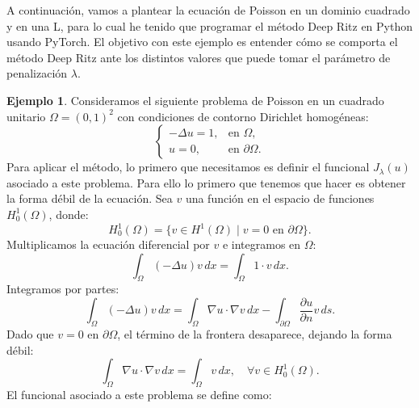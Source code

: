\documentclass[a4paper,11pt,spanish, twoside, leqno]{tfg-uam}
\theoremstyle{definition}
\newtheorem{exmp}[teor]{Ejemplo}
\begin{document}
A continuación, vamos a plantear la ecuación de Poisson en un dominio cuadrado y en una L, para lo cual he tenido que programar el método Deep Ritz en Python usando PyTorch. El objetivo con este ejemplo es entender cómo se comporta el método Deep Ritz ante los distintos valores que puede tomar el parámetro de penalización $\lambda$.

\begin{mdframed}
    \begin{exmp}
        Consideramos el siguiente problema de Poisson en un cuadrado unitario $\Omega = (0,1)^2$ con condiciones de contorno Dirichlet homogéneas:
        \begin{equation}\label{eq:poisson_square}
        \begin{cases}
        -\Delta u = 1, & \text{en } \Omega,\\
        u = 0, & \text{en } \partial \Omega.
        \end{cases}            
        \end{equation}
        Para aplicar el método, lo primero que necesitamos es definir el funcional $J_\lambda(u)$ asociado a este problema. Para ello lo primero que tenemos que hacer es obtener la forma débil de la ecuación. Sea $ v $ una función en el espacio de funciones $H_0^1(\Omega) $, donde:
        \begin{equation*}
        H_0^1(\Omega) = \{ v \in H^1(\Omega) \mid v = 0 \text{ en } \partial \Omega \}.
        \end{equation*}
        Multiplicamos la ecuación diferencial por $v$ e integramos en $\Omega$:
        \begin{equation*}
        \int_{\Omega} (-\Delta u) v \,dx = \int_{\Omega} 1 \cdot v \,dx.
        \end{equation*}
        Integramos por partes:
        \begin{equation*}
        \int_{\Omega} (-\Delta u) v \,dx = \int_{\Omega} \nabla u \cdot \nabla v \,dx - \int_{\partial\Omega} \frac{\partial u}{\partial n} v \,ds.
        \end{equation*}
        Dado que $ v = 0 $ en $ \partial \Omega $, el término de la frontera desaparece, dejando la forma débil:
        \begin{equation*}
        \int_{\Omega} \nabla u \cdot \nabla v \,dx = \int_{\Omega} v \,dx, \quad \forall v \in H_0^1(\Omega).
        \end{equation*}
        El funcional asociado a este problema se define como:
        \begin{equation*}

\end{equation*}
\end{exmp}
\end{mdframed}
\end{document}

